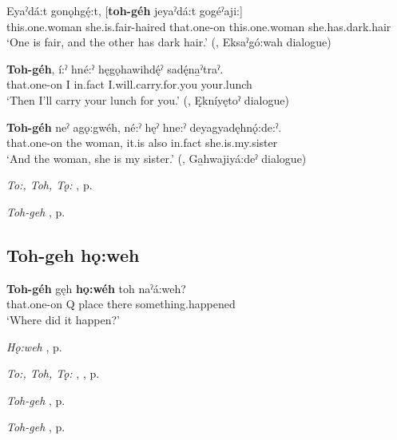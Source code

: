 \ea
\label{ex:tpart76}
\gll Eyaˀdá:t gonǫhgę́:t, [\textbf{toh-géh} jeyaˀdá:t gogéˀaji:]\\
this.one.woman she.is.fair-haired that.one-on this.one.woman she.has.dark.hair\\
\glt ‘One is fair, and the other has dark hair.’ (\cite[88]{mithun_watewayestanih_1984}, Eksaˀgó:wah dialogue)
\z

\ea
\label{ex:tpart77}
\gll \textbf{Toh-géh}, í:ˀ hné:ˀ hęgǫhawihdę́ˀ sadę́na̱ˀtraˀ.\\
that.one-on I in.fact I.will.carry.for.you your.lunch\\
\glt ‘Then I’ll carry your lunch for you.’ (\cite[494]{mithun_watewayestanih_1984}, Ękníyętoˀ dialogue)
\z

\ea
\label{ex:tpart78}
\gll \textbf{Toh-géh} neˀ agǫ:gwéh, né:ˀ hęˀ hne:ˀ deyagyadęhnǫ́:de:ˀ.\\
that.one-on the woman, it.is also in.fact she.is.my.sister\\
\glt ‘And the woman, she is my sister.’ (\cite[257]{mithun_watewayestanih_1984}, Ga̱hwajiyá:deˀ dialogue)
\z

\begin{CayugaRelated}
\item \textit{To:, Toh, Tǫ:} , p. \pageref{p:[to:] ‘that one’}\\
\item \textit{Toh-geh} , p. \pageref{p:[toh-geh] ‘there, ‘then’}
\end{CayugaRelated}

\subsection*{\textbf{Toh-geh hǫ:weh} } \label{p:[toh-geh hǫ:weh]}

\ea
\label{ex:tpart79}
\gll \textbf{Toh-géh} gęh \textbf{hǫ:wéh} toh naˀá:weh?\\
that.one-on Q place there something.happened\\
\glt ‘Where did it happen?’
\z

\begin{CayugaRelated}
\item \textit{Hǫ:weh} , p. \pageref{p:[hǫ:weh]}\\
\item \textit{To:, Toh, Tǫ:} , , p. \pageref{p:[to:] ‘there’, ‘that place’}\\
\item \textit{Toh-geh} , p. \pageref{p:[toh-geh] ‘there, ‘then’}\\
\item \textit{Toh-geh} , p. \pageref{p:[toh-geh] ‘and then’}
\end{CayugaRelated}

